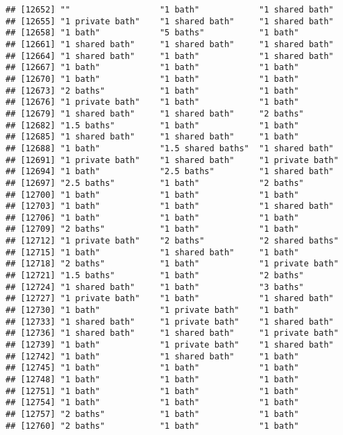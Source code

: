 \documentclass[
]{article}
\begin{document}
\begin{verbatim}
## [12652] ""                  "1 bath"            "1 shared bath"    
## [12655] "1 private bath"    "1 shared bath"     "1 shared bath"    
## [12658] "1 bath"            "5 baths"           "1 bath"           
## [12661] "1 shared bath"     "1 shared bath"     "1 shared bath"    
## [12664] "1 shared bath"     "1 bath"            "1 shared bath"    
## [12667] "1 bath"            "1 bath"            "1 bath"           
## [12670] "1 bath"            "1 bath"            "1 bath"           
## [12673] "2 baths"           "1 bath"            "1 bath"           
## [12676] "1 private bath"    "1 bath"            "1 bath"           
## [12679] "1 shared bath"     "1 shared bath"     "2 baths"          
## [12682] "1.5 baths"         "1 bath"            "1 bath"           
## [12685] "1 shared bath"     "1 shared bath"     "1 bath"           
## [12688] "1 bath"            "1.5 shared baths"  "1 shared bath"    
## [12691] "1 private bath"    "1 shared bath"     "1 private bath"   
## [12694] "1 bath"            "2.5 baths"         "1 shared bath"    
## [12697] "2.5 baths"         "1 bath"            "2 baths"          
## [12700] "1 bath"            "1 bath"            "1 bath"           
## [12703] "1 bath"            "1 bath"            "1 shared bath"    
## [12706] "1 bath"            "1 bath"            "1 bath"           
## [12709] "2 baths"           "1 bath"            "1 bath"           
## [12712] "1 private bath"    "2 baths"           "2 shared baths"   
## [12715] "1 bath"            "1 shared bath"     "1 bath"           
## [12718] "2 baths"           "1 bath"            "1 private bath"   
## [12721] "1.5 baths"         "1 bath"            "2 baths"          
## [12724] "1 shared bath"     "1 bath"            "3 baths"          
## [12727] "1 private bath"    "1 bath"            "1 shared bath"    
## [12730] "1 bath"            "1 private bath"    "1 bath"           
## [12733] "1 shared bath"     "1 private bath"    "1 shared bath"    
## [12736] "1 shared bath"     "1 shared bath"     "1 private bath"   
## [12739] "1 bath"            "1 private bath"    "1 shared bath"    
## [12742] "1 bath"            "1 shared bath"     "1 bath"           
## [12745] "1 bath"            "1 bath"            "1 bath"           
## [12748] "1 bath"            "1 bath"            "1 bath"           
## [12751] "1 bath"            "1 bath"            "1 bath"           
## [12754] "1 bath"            "1 bath"            "1 bath"           
## [12757] "2 baths"           "1 bath"            "1 bath"           
## [12760] "2 baths"           "1 bath"            "1 bath"           

\end{verbatim}
\end{document}
